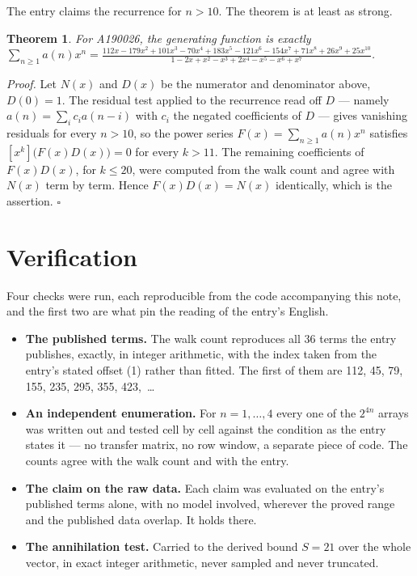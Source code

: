 \documentclass[11pt]{article}
\newtheorem{theorem}{Theorem}
\theoremstyle{definition}
\begin{document}
The entry claims the recurrence for $n > 10$. The theorem is at least as strong.

\begin{theorem} For A190026, the generating function is exactly $\sum_{n\ge 1} a(n)x^n = \frac{112x - 179x^{2} + 101x^{3} - 70x^{4} + 183x^{5} - 121x^{6} - 154x^{7} + 71x^{8} + 26x^{9} + 25x^{10}}{1 - 2x + x^{2} - x^{3} + 2x^{4} - x^{5} - x^{6} + x^{7}}$.\end{theorem}

{\itshape Proof.} Let $N(x)$ and $D(x)$ be the numerator and denominator above, $D(0)=1$. The residual test applied to the recurrence read off $D$ --- namely $a(n) = \sum_i c_i a(n-i)$ with $c_i$ the negated coefficients of $D$ --- gives vanishing residuals for every $n > 10$, so the power series $F(x)=\sum_{n\ge 1}a(n)x^n$ satisfies $[x^k]\bigl(F(x)D(x)\bigr) = 0$ for every $k > 11$. The remaining coefficients of $F(x)D(x)$, for $k \le 20$, were computed from the walk count and agree with $N(x)$ term by term. Hence $F(x)D(x) = N(x)$ identically, which is the assertion. $\square$

\section{Verification}

Four checks were run, each reproducible from the code accompanying this note, and the first two are what pin the reading of the entry's English.

\begin{itemize}

\item {\bfseries The published terms.} The walk count reproduces all 36 terms the entry publishes, exactly, in integer arithmetic, with the index taken from the entry's stated offset (1) rather than fitted. The first of them are 112, 45, 79, 155, 235, 295, 355, 423,~\dots

\item {\bfseries An independent enumeration.} For $n = 1,\dots,4$ every one of the $2^{4n}$ arrays was written out and tested cell by cell against the condition as the entry states it --- no transfer matrix, no row window, a separate piece of code. The counts agree with the walk count and with the entry.

\item {\bfseries The claim on the raw data.} Each claim was evaluated on the entry's published terms alone, with no model involved, wherever the proved range and the published data overlap. It holds there.

\item {\bfseries The annihilation test.} Carried to the derived bound $S = 21$ over the whole vector, in exact integer arithmetic, never sampled and never truncated.

\end{itemize}
\end{document}
